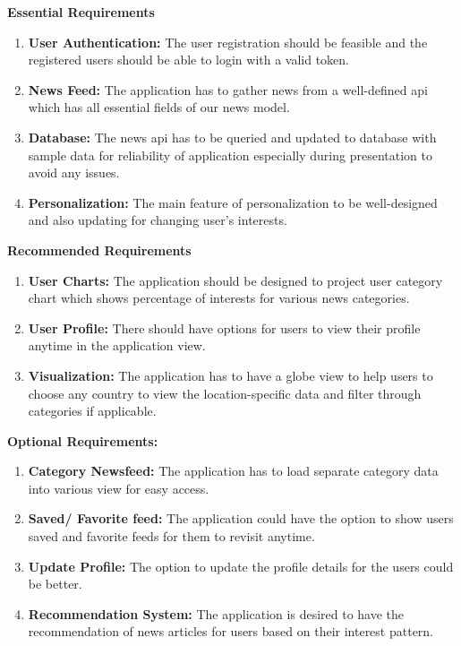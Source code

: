  \textbf{ \large Essential Requirements}
 \begin{enumerate}
 \item{\bf User Authentication:}
 The user registration should be feasible and the registered users should be able to login with a valid token.
 \item{\bf News Feed:}
 The application has to gather news from a well-defined api which has all essential fields of our news model.
 \item{\bf Database:}
 The news api has to be queried and updated to database with sample data for reliability of application especially during presentation to avoid any issues.
 \item{ \bf Personalization:}
 The main feature of personalization to be well-designed and also updating for changing user's interests.
 \end{enumerate}
 \textbf{ \large Recommended Requirements}
 \begin{enumerate}
 \item{\bf User Charts:}
 The application should be designed to project user category chart which shows percentage of interests for various news categories.
\item {\bf User Profile:} There should have options for users to view their profile anytime in the application view.
\item{\bf Visualization:}
The application has to have a globe view to help users to choose any country to view the location-specific data and filter through categories if applicable.
\end{enumerate}
 \textbf{ \large Optional Requirements:}
 \begin{enumerate}
 \item{\bf Category Newsfeed:}
 The application has to load separate category data into various view for easy access.
 \item{\bf Saved/ Favorite feed:} The application could have the option to show users saved and favorite feeds for them to revisit anytime.
 \item {\bf Update Profile: } The option to update the profile details for the users could be better.
\item{\bf Recommendation System:} The application is desired to have the recommendation of news articles for users based on their interest pattern.
\end{enumerate}

